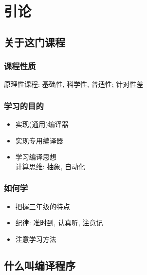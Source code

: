 \chapter{引论}

\section{关于这门课程}
    
    \subsection{课程性质}

        原理性课程: 基础性, 科学性, 普适性; 针对性差

    \subsection{学习的目的}

        \begin{itemize}
            \item 实现(通用)编译器
            \item 实现专用编译器
            \item 学习编译思想 \\
                计算思维: 抽象, 自动化
        \end{itemize}

    \subsection{如何学}

        \begin{itemize}
            \item 把握三年级的特点
            \item 纪律: 准时到, 认真听, 注意记
            \item 注意学习方法
        \end{itemize}

\section{什么叫编译程序}

